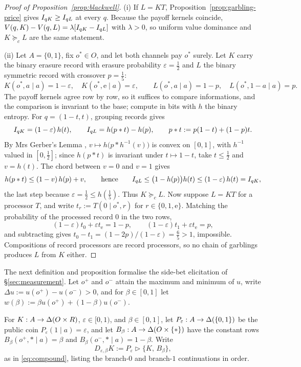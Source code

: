 \begin{proof}[Proof of Proposition~\ref{prop:blackwell}]
(i) If $L=KT$, Proposition~\ref{prop:garbling-price} gives $I_{qK}\ge I_{qL}$ at every $q$.  Because the payoff
kernels coincide, $V(q,K)-V(q,L)=\lambda[I_{qK}-I_{qL}]$ with $\lambda>0$, so uniform value dominance and
$K\succeq_cL$ are the same statement.

(ii) Let $A=\{0,1\}$, fix $o^\ast\in O$, and let both channels pay $o^\ast$ surely.  Let $K$ carry the binary
erasure record with erasure probability $\varepsilon=\tfrac12$ and $L$ the binary symmetric record with crossover
$p=\tfrac15$:
\[
 K(o^\ast,a\mid a)=1-\varepsilon,\quad K(o^\ast,\mathrm e\mid a)=\varepsilon,
 \qquad
 L(o^\ast,a\mid a)=1-p,\quad L(o^\ast,1-a\mid a)=p.
\]
The payoff kernels agree row by row, so it suffices to compare informations, and the comparison is invariant to the
base; compute in bits with $h$ the binary entropy.  For $q=(1-t,t)$, grouping records gives
\[
 I_{qK}=(1-\varepsilon)\,h(t),
 \qquad
 I_{qL}=h(p\ast t)-h(p),
 \qquad p\ast t:=p(1-t)+(1-p)t.
\]
By Mrs Gerber's Lemma \cite{WynerZiv1973}, $v\mapsto h\bigl(p\ast h^{-1}(v)\bigr)$ is convex on $[0,1]$, with
$h^{-1}$ valued in $[0,\tfrac12]$; since $h(p\ast t)$ is invariant under $t\mapsto1-t$, take $t\le\tfrac12$ and
$v=h(t)$.  The chord between $v=0$ and $v=1$ gives
\[
 h(p\ast t)\le(1-v)\,h(p)+v,
 \qquad\text{hence}\qquad
 I_{qL}\le\bigl(1-h(p)\bigr)h(t)\le(1-\varepsilon)\,h(t)=I_{qK},
\]
the last step because $\varepsilon=\tfrac12\le h(\tfrac15)$.  Thus $K\succeq_cL$.  Now suppose $L=KT$ for a
processor $T$, and write $t_r:=T(0\mid o^\ast,r)$ for $r\in\{0,1,\mathrm e\}$.  Matching the probability of the
processed record $0$ in the two rows,
\[
 (1-\varepsilon)t_0+\varepsilon t_{\mathrm e}=1-p,
 \qquad
 (1-\varepsilon)t_1+\varepsilon t_{\mathrm e}=p,
\]
and subtracting gives $t_0-t_1=(1-2p)/(1-\varepsilon)=\tfrac65>1$, impossible.  Compositions of record processors
are record processors, so no chain of garblings produces $L$ from $K$ either.
\end{proof}

The next definition and proposition formalise the side-bet elicitation of \S\ref{sec:measurement}.  Let $o^+$
and $o^-$ attain the maximum and minimum of $u$, write $\Delta u:=u(o^+)-u(o^-)>0$, and for $\beta\in[0,1]$ let
$w(\beta):=\beta u(o^+)+(1-\beta)u(o^-)$.

\begin{definition}\label{def:dilution}
For $K:A\to\Delta(O\times R)$, $\varepsilon\in[0,1)$, and $\beta\in[0,1]$, let $P_\varepsilon:A\to\Delta(\{0,1\})$ be the
public coin $P_\varepsilon(1\mid a)=\varepsilon$, and let $B_\beta:A\to\Delta(O\times\{\ast\})$ have the constant rows
$B_\beta(o^+,\ast\mid a)=\beta$ and $B_\beta(o^-,\ast\mid a)=1-\beta$.  Write
\[
 D_{\varepsilon,\beta}K:=P_\varepsilon\triangleright\{K,\,B_\beta\},
\]
as in \eqref{eq:compound}, listing the branch-$0$ and branch-$1$ continuations in order.
\end{definition}

